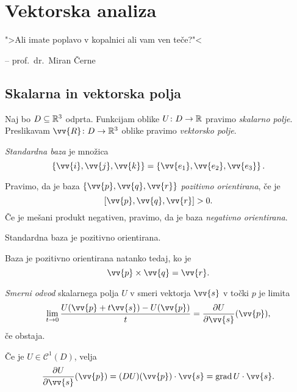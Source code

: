 \section{Vektorska analiza}

\epigraph{">Ali imate poplavo v kopalnici ali vam ven teče?"<}
{-- prof.~dr.~Miran Černe}

\subsection{Skalarna in vektorska polja}

\begin{definicija}
Naj bo $D \subseteq \mathbb{R}^3$ odprta. Funkcijam oblike
$U \colon D \to \mathbb{R}$ pravimo
\emph{skalarno polje}. Preslikavam
$\vv{R} \colon D \to \R^3$ oblike pravimo \emph{vektorsko polje}.
\end{definicija}

\begin{definicija}
\emph{Standardna baza} je množica
\[
\set{\vv{i}, \vv{j}, \vv{k}} = \set{\vv{e_1}, \vv{e_2}, \vv{e_3}}.
\]
\end{definicija}

\begin{definicija}
Pravimo, da je baza $\set{\vv{p}, \vv{q}, \vv{r}}$
\emph{pozitivno orientirana}, če je
\[
[\vv{p}, \vv{q}, \vv{r}] > 0.
\]
Če je mešani produkt negativen, pravimo, da je baza
\emph{negativno orientirana}.
\end{definicija}

\begin{opomba}
Standardna baza je pozitivno orientirana.
\end{opomba}

\begin{opomba}
Baza je pozitivno orientirana natanko tedaj, ko je
\[
\vv{p} \times \vv{q} = \vv{r}.
\]
\end{opomba}


\begin{definicija}
\emph{Smerni odvod} skalarnega polja
$U$ v smeri vektorja $\vv{s}$ v točki $p$ je limita
\[
\lim_{t \to 0}
\frac{U(\vv{p} + t \vv{s}) - U(\vv{p})}{t} =
\frac{\partial U}{\partial \vv{s}}(\vv{p}),
\]
če obstaja.
\end{definicija}

\begin{opomba}
Če je $U \in \mathcal{C}^1(D)$, velja
\[
\frac{\partial U}{\partial \vv{s}}(\vv{p}) =
(DU)(\vv{p}) \cdot \vv{s} =
\grad U \cdot \vv{s}.
\]
\end{opomba}

